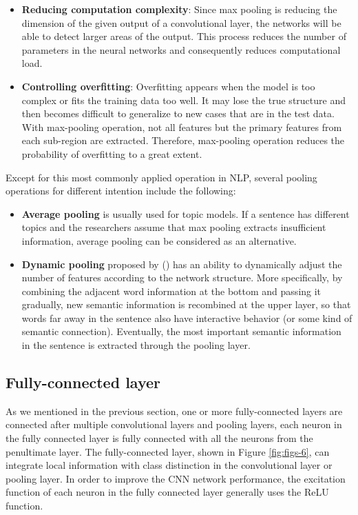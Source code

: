 \documentclass[]{krantz}
\providecommand{\tightlist}{%
  \setlength{\itemsep}{0pt}\setlength{\parskip}{0pt}}
\begin{document}
\begin{itemize}
\tightlist
\item
  \textbf{Reducing computation complexity}: Since max pooling is reducing the dimension of the given output of a convolutional layer, the networks will be able to detect larger areas of the output. This process reduces the number of parameters in the neural networks and consequently reduces computational load.
\item
  \textbf{Controlling overfitting}: Overfitting appears when the model is too complex or fits the training data too well. It may lose the true structure and then becomes difficult to generalize to new cases that are in the test data. With max-pooling operation, not all features but the primary features from each sub-region are extracted. Therefore, max-pooling operation reduces the probability of overfitting to a great extent.
\end{itemize}

Except for this most commonly applied operation in NLP, several pooling operations for different intention include the following:

\begin{itemize}
\item
  \textbf{Average pooling} is usually used for topic models. If a sentence has different topics and the researchers assume that max pooling extracts insufficient information, average pooling can be considered as an alternative.
\item
  \textbf{Dynamic pooling} proposed by (\citet{Kalchbrenner2014ACN}) has an ability to dynamically adjust the number of features according to the network structure. More specifically, by combining the adjacent word information at the bottom and passing it gradually, new semantic information is recombined at the upper layer, so that words far away in the sentence also have interactive behavior (or some kind of semantic connection). Eventually, the most important semantic information in the sentence is extracted through the pooling layer.
\end{itemize}

\hypertarget{fully-connected-layer}{%
\subsection{Fully-connected layer}\label{fully-connected-layer}}

As we mentioned in the previous section, one or more fully-connected layers are connected after multiple convolutional layers and pooling layers, each neuron in the fully connected layer is fully connected with all the neurons from the penultimate layer. The fully-connected layer, shown in Figure \ref{fig:figs-6}, can integrate local information with class distinction in the convolutional layer or pooling layer. In order to improve the CNN network performance, the excitation function of each neuron in the fully connected layer generally uses the ReLU function.
\end{document}
